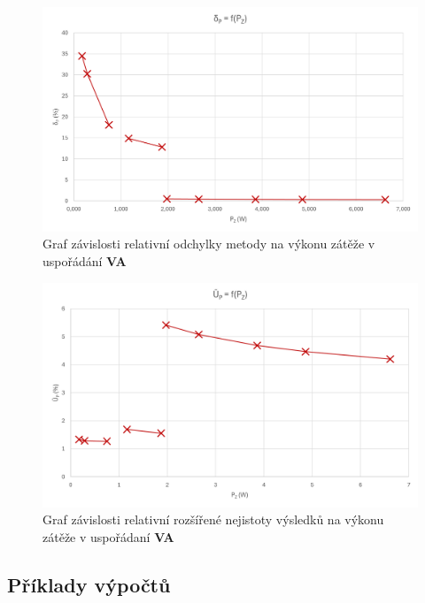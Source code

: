 \documentclass[a4paper, czech]{article}
\begin{document}
\begin{figure}[H]
    \includegraphics[width = \textwidth]{graf_va1.png}
    \caption{Graf závislosti relativní odchylky metody na výkonu zátěže v uspořádání \textbf{VA}}
\end{figure}

\begin{figure}[H]
    \includegraphics[width = \textwidth]{graf_va2.png}
    \caption{Graf závislosti relativní rozšířené nejistoty výsledků na výkonu zátěže v uspořádaní \textbf{VA}}
\end{figure}

\break

\subsection{Příklady výpočtů}
\end{document}
